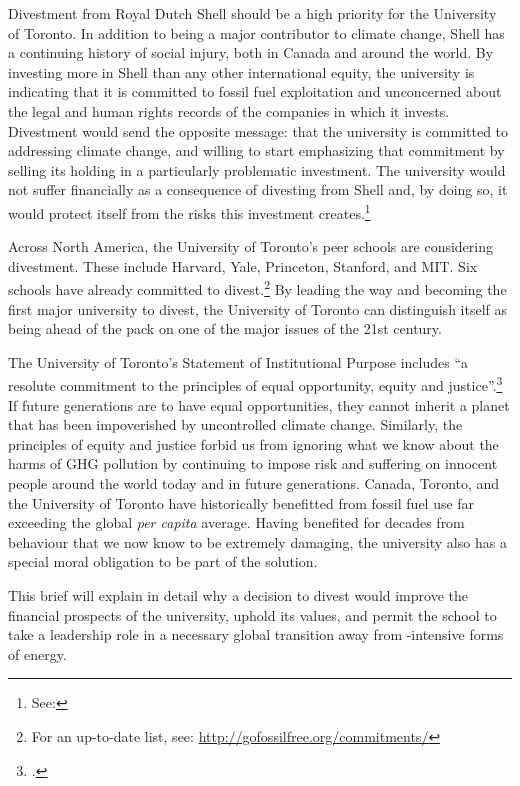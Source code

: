 Divestment from Royal Dutch Shell should be a high priority for the University of Toronto. 
In addition to being a major contributor to climate change, Shell has a continuing history of social injury, both in Canada and around the world. 
By investing more in Shell than any other international equity, the university is indicating that it is committed to fossil fuel exploitation and unconcerned about the legal and human rights records of the companies in which it invests.
Divestment would send the opposite message: that the university is committed to addressing climate change, and willing to start emphasizing that commitment by selling its holding in a particularly problematic investment.  
The university would not suffer financially as a consequence of divesting from Shell and, by doing so, it would protect itself from the risks this investment creates.\footnote{See: }



Across North America, the University of Toronto's peer schools are considering divestment.
These include Harvard, Yale, Princeton, Stanford, and MIT.
Six schools have already committed to divest.\footnote{For an up-to-date list, see: \url{http://gofossilfree.org/commitments/}}
By leading the way and becoming the first major university to divest, the University of Toronto can distinguish itself as being ahead of the pack on one of the major issues of the 21st century.




The University of Toronto's Statement of Institutional Purpose includes ``a resolute commitment to the principles of equal opportunity, equity and justice''.\footcite{InstitutionalPurpose}
If future generations are to have equal opportunities, they cannot inherit a planet that has been impoverished by uncontrolled climate change.
Similarly, the principles of equity and justice forbid us from ignoring what we know about the harms of GHG pollution by continuing to impose risk and suffering on innocent people around the world today and in future generations.
Canada, Toronto, and the University of Toronto have historically benefitted from fossil fuel use far exceeding the global \emph{per capita} average.
Having benefited for decades from behaviour that we now know to be extremely damaging, the university also has a special moral obligation to be part of the solution.



This brief will explain in detail why a decision to divest would improve the financial prospects of the university, uphold its values, and permit the school to take a leadership role in a necessary global transition away from -intensive forms of energy. 



